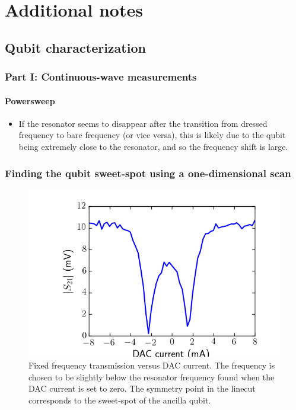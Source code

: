 \chapter{Additional notes}
  \section{Qubit characterization}
    \subsection{Part I: Continuous-wave measurements}
      \subsubsection{Powersweep}
        \begin{itemize}
          \item If the resonator seems to disappear after the transition from dressed frequency to bare frequency (or vice versa), this is likely due to the qubit being extremely close to the resonator, and so the frequency shift is large.
        \end{itemize}
      \subsection{Finding the qubit sweet-spot using a one-dimensional scan}
        \label{Finding the qubit sweet-spot using a one-dimensional scan}
        \begin{figure}[tb]
          \centering
          \includegraphics[width=.6\linewidth]{../Figures/Qubit characterization/Resonator vs DAC linecut.png}
          \caption{Fixed frequency transmission versus DAC current. The frequency is chosen to be slightly below the resonator frequency found when the DAC current is set to zero. The symmetry point in the linecut corresponds to the sweet-spot of the ancilla qubit.}
          \label{fig:resonator vs dac linecut}
        \end{figure}

